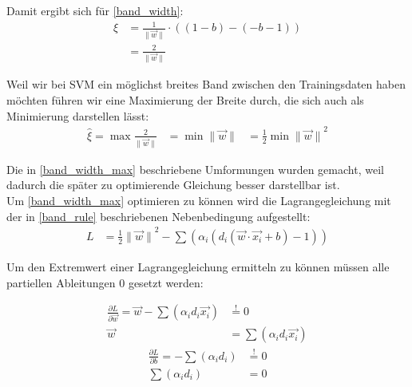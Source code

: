\documentclass[a4paper,11pt,twoside]{scrreprt}
\begin{document}
Damit ergibt sich für \autoref{band_width}:
\begin{equation} \label{band_width_final}
    \begin{aligned}
    \xi &= \frac{1}{\lVert \vec{w} \rVert} \cdot ((1-b) - (-b-1)) \\
    &= \frac{2}{\lVert \vec{w} \rVert}
    \end{aligned}
\end{equation}

Weil wir bei \ac{SVM} ein möglichst breites Band zwischen den Trainingsdaten haben möchten führen wir eine Maximierung der Breite durch, die sich auch als Minimierung darstellen lässt:
\begin{equation} \label{band_width_max}
    \begin{aligned}
    \hat{\xi} = \max \frac{2}{\lVert \vec{w} \rVert} &= \min {\lVert \vec{w} \rVert} &= \frac{1}{2} \min {\lVert \vec{w} \rVert}^{2}
    \end{aligned}
\end{equation}

Die in \autoref{band_width_max} beschriebene Umformungen wurden gemacht, weil dadurch die später zu optimierende Gleichung besser darstellbar ist. \\

Um \autoref{band_width_max} optimieren zu können wird die Lagrangegleichung mit der in \autoref{band_rule} beschriebenen Nebenbedingung aufgestellt:
\begin{equation} \label{lagrange_1}
    \begin{aligned}
    L &= \frac{1}{2} {\lVert \vec{w} \rVert}^{2} - \sum (\alpha_{i} (d_{i} (\vec{w} \cdot \vec{x_{i}} + b) -1)) 
    \end{aligned}
\end{equation}

Um den Extremwert einer Lagrangegleichung ermitteln zu können müssen alle partiellen Ableitungen 0 gesetzt werden:

\begin{equation} \label{lagrange_partial_w}
    \begin{aligned}
    \frac{\partial L}{\partial \vec{w}} = \vec{w} - \sum (\alpha_{i} d_{i} \vec{x_{i}}) &\overset{!}{=} 0 \\
    \vec{w} &= \sum (\alpha_{i} d_{i} \vec{x_{i}})
    \end{aligned}
\end{equation}
\newline
\begin{equation} \label{lagrange_partial_b}
    \begin{aligned}
    \frac{\partial L}{\partial b} = - \sum (\alpha_{i} d_{i}) &\overset{!}{=} 0 \\
    \sum (\alpha_{i} d_{i}) &= 0
    \end{aligned}
\end{equation}
\end{document}
